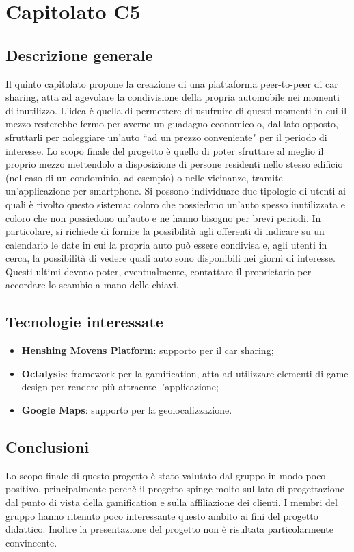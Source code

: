 \documentclass[11pt,a4paper]{article}
\begin{document}
\section{Capitolato C5}
\subsection{Descrizione generale}
Il quinto capitolato propone la creazione di una piattaforma peer-to-peer di car sharing, atta ad agevolare la condivisione della propria automobile nei momenti di inutilizzo. L'idea è quella di permettere di usufruire di questi momenti in cui il mezzo resterebbe fermo per averne un guadagno economico o, dal lato opposto, sfruttarli per noleggiare un'auto ``ad un prezzo conveniente" per il periodo di interesse.  
Lo scopo finale del progetto è quello di poter sfruttare al meglio il proprio mezzo mettendolo a disposizione di persone residenti nello stesso edificio (nel caso di un condominio, ad esempio) o nelle vicinanze, tramite un'applicazione per smartphone. 
Si possono individuare due tipologie di utenti ai quali è rivolto questo sistema: coloro che possiedono un'auto spesso inutilizzata e coloro che non possiedono un'auto e ne hanno bisogno per brevi periodi.
In particolare, si richiede di fornire la possibilità agli offerenti di indicare su un calendario le date in cui la propria auto può essere condivisa e, agli utenti in cerca, la possibilità di vedere quali auto sono disponibili nei giorni di interesse. Questi ultimi devono poter, eventualmente, contattare il proprietario per accordare lo scambio a mano delle chiavi. 
\subsection{Tecnologie interessate}
\begin{itemize}
\item \textbf{Henshing Movens Platform}: supporto per il car sharing;
\item \textbf{Octalysis}: framework per la gamification, atta ad utilizzare elementi di game design per rendere più attraente l'applicazione;
\item \textbf{Google Maps}: supporto per la geolocalizzazione.
\end{itemize}
\subsection{Conclusioni}
Lo scopo finale di questo progetto è stato valutato dal gruppo in modo poco positivo, principalmente perchè il progetto spinge molto sul lato di progettazione dal punto di vista della gamification e sulla affiliazione dei clienti. I membri del gruppo hanno ritenuto poco interessante questo ambito ai fini del progetto didattico. Inoltre la presentazione del progetto non è risultata particolarmente convincente.
\newpage
\end{document}
